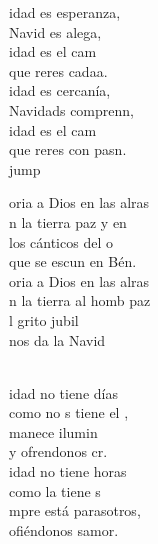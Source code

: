 \begin{cancion}%
	idad es esperanza, \\
	Navid es alega,\\
	idad es el cam \\
	que reres cadaa. \\
	idad es cercanía, \\
	Navidads comprenn, \\
	idad es el cam \\
	que reres con pasn. \\jump\\
	\begin{chorus}%
	oria a Dios en las alras\\
	n la tierra paz y en\\
	los cánticos del o\\
	que se escun en Bén.\\
	oria a Dios en las alras\\
	n la tierra al homb paz\\
	l grito jubil\\
	 nos da la Navid\\
	\end{chorus}%
	\jump\\
	idad no tiene días \\
	como no s tiene el ,\\
	manece ilumin \\
	y ofrendonos cr. \\
	idad no tiene horas\\
	como  la tiene s\\
	mpre está parasotros,\\
	ofiéndonos samor.\\
\end{cancion}%

